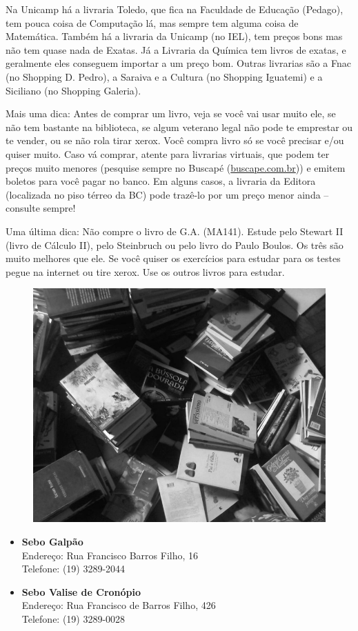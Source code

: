 Na Unicamp há a livraria Toledo, que fica na Faculdade de Educação (Pedago), tem
pouca coisa de Computação lá, mas sempre tem alguma coisa de Matemática. Também
há a livraria da Unicamp (no IEL), tem preços bons mas não tem quase nada de
Exatas. Já a Livraria da Química tem livros de exatas, e geralmente eles
conseguem importar a um preço bom. Outras livrarias são a Fnac (no Shopping D.
Pedro), a Saraiva e a Cultura (no Shopping Iguatemi) e a Siciliano (no Shopping
Galeria).

Mais uma dica: Antes de comprar um livro, veja se você vai usar muito ele, se
não tem bastante na biblioteca, se algum veterano legal não pode te emprestar ou
te vender, ou se não rola tirar xerox. Você compra livro só se você precisar
e/ou quiser muito. Caso vá comprar, atente para livrarias virtuais, que podem
ter preços muito menores (pesquise sempre no Buscapé (\url{buscape.com.br})) e
emitem boletos para você pagar no banco.  Em alguns casos, a livraria da Editora
(localizada no piso térreo da BC) pode trazê-lo por um preço menor ainda --
consulte sempre!

Uma última dica: Não compre o livro de G.A. (MA141). Estude pelo Stewart II
(livro de Cálculo II), pelo Steinbruch ou pelo livro do Paulo Boulos. Os três
são muito melhores que ele. Se você quiser os exercícios para estudar para os
testes pegue na internet ou tire xerox. Use os outros livros para estudar.

\begin{figure}[h!]
    \centering
    \includegraphics[width=.45\textwidth]{img/barao/sebo.jpg}
\end{figure}

\begin{itemize}
    \item   \textbf{Sebo Galpão}
        \\Endereço: Rua Francisco Barros Filho, 16
        \\Telefone: (19) 3289-2044

    \item   \textbf{Sebo Valise de Cronópio}
        \\Endereço: Rua Francisco de Barros Filho, 426
        \\Telefone: (19) 3289-0028
\end{itemize}

